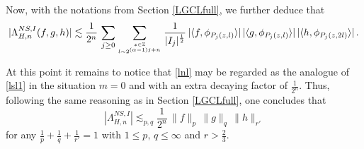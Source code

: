 \documentclass[a4paper,reqno]{amsart}
\numberwithin{equation}{section}
\theoremstyle{definition}
\newcommand{\Z}{\mathbb{Z}}
\def\a{\alpha}
\def\L{\Lambda}
\begin{document}
Now, with the notations from Section \ref{LGCLfull}, we further deduce that
\begin{equation}\label{lnl}
|\L^{NS,I}_{H,n}(f,g,h)|\lesssim \frac{1}{2^n}\,\sum_{j\geq 0}\sum_{{z\in\Z}\atop{l\sim 2^{(\a-1)j+n}}}\frac{1}{|I_{j}|^{\frac{1}{2}}}\,|\langle f,  \phi_{P_{j}(z,l)}\rangle|\,
|\langle g,  \phi_{P_{j}(z,l)}\rangle|\,|\langle h,  \phi_{P_{j}(z,2l)}\rangle|\,.
\end{equation}

At this point it remains to notice that \eqref{lnl} may be regarded as the analogue of \eqref{lsl1} in the situation $m=0$ and with an extra decaying factor of $\frac{1}{2^n}$. Thus, following the same reasoning as in Section \ref{LGCLfull}, one concludes that
\begin{equation}\label{flrangenll}
|\L^{NS,I}_{H,n}|\lesssim_{p,q} \frac{1}{2^n}\,\|f\|_p\,\|g\|_q\,\|h\|_{r'}
\end{equation}
for any $\frac{1}{p}+\frac{1}{q}+\frac{1}{r'}=1$ with $1\leq p,\,q\leq \infty$ and $r>\frac{2}{3}$.
\end{document}

